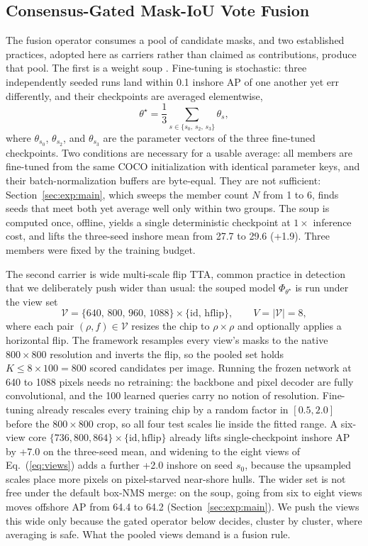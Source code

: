 \subsection{Consensus-Gated Mask-IoU Vote Fusion}\label{sec:fusion}

The fusion operator consumes a pool of candidate masks, and two established practices, adopted here as carriers rather than claimed as contributions, produce that pool. The first is a weight soup \cite{modelsoups2022}. Fine-tuning is stochastic: three independently seeded runs land within 0.1 inshore AP of one another yet err differently, and their checkpoints are averaged elementwise,
\begin{equation}\label{eq:soup}
\theta^{\star}=\frac{1}{3}\sum_{s\in\{s_0,\,s_2,\,s_3\}}\theta_s,
\end{equation}
where $\theta_{s_0}$, $\theta_{s_2}$, and $\theta_{s_3}$ are the parameter vectors of the three fine-tuned checkpoints. Two conditions are necessary for a usable average: all members are fine-tuned from the same COCO initialization with identical parameter keys, and their batch-normalization buffers are byte-equal. They are not sufficient: Section~\ref{sec:exp:main}, which sweeps the member count $N$ from 1 to 6, finds seeds that meet both yet average well only within two groups. The soup is computed once, offline, yields a single deterministic checkpoint at $1\times$ inference cost, and lifts the three-seed inshore mean from 27.7 to 29.6 (+1.9). Three members were fixed by the training budget.

The second carrier is wide multi-scale flip TTA, common practice in detection that we deliberately push wider than usual: the souped model $\Phi_{\theta^{\star}}$ is run under the view set
\begin{equation}\label{eq:views}
\mathcal{V}=\{640,\,800,\,960,\,1088\}\times\{\mathrm{id},\,\mathrm{hflip}\},
\qquad V=|\mathcal{V}|=8,
\end{equation}
where each pair $(\rho,f)\in\mathcal{V}$ resizes the chip to $\rho\times\rho$ and optionally applies a horizontal flip. The framework resamples every view's masks to the native $800\times 800$ resolution and inverts the flip, so the pooled set holds $K\le 8\times 100=800$ scored candidates per image. Running the frozen network at 640 to 1088 pixels needs no retraining: the backbone and pixel decoder are fully convolutional, and the 100 learned queries carry no notion of resolution. Fine-tuning already rescales every training chip by a random factor in $[0.5,2.0]$ before the $800\times 800$ crop, so all four test scales lie inside the fitted range. A six-view core $\{736,800,864\}\times\{\mathrm{id},\mathrm{hflip}\}$ already lifts single-checkpoint inshore AP by +7.0 on the three-seed mean, and widening to the eight views of Eq.~(\ref{eq:views}) adds a further +2.0 inshore on seed $s_0$, because the upsampled scales place more pixels on pixel-starved near-shore hulls. The wider set is not free under the default box-NMS merge: on the soup, going from six to eight views moves offshore AP from 64.4 to 64.2 (Section~\ref{sec:exp:main}). We push the views this wide only because the gated operator below decides, cluster by cluster, where averaging is safe. What the pooled views demand is a fusion rule.

